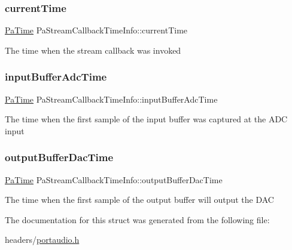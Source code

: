 \subsubsection{\texorpdfstring{current\+Time}{currentTime}}
{\footnotesize\ttfamily \hyperlink{portaudio_8h_af17a7e6d0471a23071acf8dbd7bbe4bd}{Pa\+Time} Pa\+Stream\+Callback\+Time\+Info\+::current\+Time}

The time when the stream callback was invoked \mbox{\label{struct_pa_stream_callback_time_info_ad114a6d5e1cf2cdd75837c33c1c8bb4c}} 
\subsubsection{\texorpdfstring{input\+Buffer\+Adc\+Time}{inputBufferAdcTime}}
{\footnotesize\ttfamily \hyperlink{portaudio_8h_af17a7e6d0471a23071acf8dbd7bbe4bd}{Pa\+Time} Pa\+Stream\+Callback\+Time\+Info\+::input\+Buffer\+Adc\+Time}

The time when the first sample of the input buffer was captured at the A\+DC input \mbox{\label{struct_pa_stream_callback_time_info_aa2052c42394fca748e83517fc8942609}} 
\subsubsection{\texorpdfstring{output\+Buffer\+Dac\+Time}{outputBufferDacTime}}
{\footnotesize\ttfamily \hyperlink{portaudio_8h_af17a7e6d0471a23071acf8dbd7bbe4bd}{Pa\+Time} Pa\+Stream\+Callback\+Time\+Info\+::output\+Buffer\+Dac\+Time}

The time when the first sample of the output buffer will output the D\+AC 

The documentation for this struct was generated from the following file\+:\begin{DoxyCompactItemize}
\item 
headers/\hyperlink{portaudio_8h}{portaudio.\+h}\end{DoxyCompactItemize}
